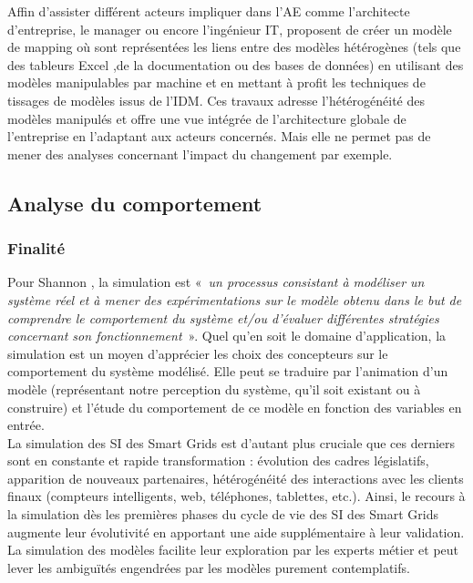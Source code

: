 	Affin d'assister différent acteurs impliquer dans l'AE comme l'architecte d'entreprise, le manager ou encore l'ingénieur IT, \cite{bruneliere2013support} proposent de créer un modèle de mapping où sont représentées les liens entre des modèles hétérogènes (tels que des tableurs Excel ,de la documentation ou des bases de données) en utilisant des modèles manipulables par machine et en mettant à profit les techniques de tissages de modèles issus de l'IDM. Ces travaux adresse l'hétérogénéité des modèles manipulés et offre une vue intégrée de l'architecture globale de l'entreprise en l'adaptant aux acteurs concernés. Mais elle ne permet pas de mener des analyses concernant l'impact du changement par exemple.   

	
	\subsection{Analyse du comportement}
	\subsubsection{Finalité}
	Pour Shannon \cite{shannon1975systems}, la simulation est 
«~\emph{un processus consistant à modéliser un système réel et à mener des expérimentations sur le modèle obtenu dans le but de comprendre le comportement du système et/ou d'évaluer différentes stratégies concernant son fonctionnement}~». 
Quel qu'en soit le domaine d'application, la simulation est un moyen d'apprécier les choix des concepteurs sur le comportement du système modélisé. Elle peut se traduire par l'animation d'un modèle (représentant notre perception du système, qu'il soit existant ou à construire) et l'étude du comportement de ce modèle en fonction des variables en entrée.  
\\La simulation des SI des Smart Grids est d'autant plus cruciale que ces derniers sont en constante et rapide transformation : évolution des cadres législatifs,  apparition de nouveaux partenaires, hétérogénéité des interactions avec les clients finaux (compteurs intelligents, web, téléphones, tablettes, etc.). Ainsi, le recours à la simulation dès les premières phases du cycle de vie des SI des Smart Grids augmente leur évolutivité en apportant une aide supplémentaire à leur validation. La simulation des modèles facilite leur exploration  par les experts métier et peut lever les ambiguïtés engendrées par les modèles purement contemplatifs. 


